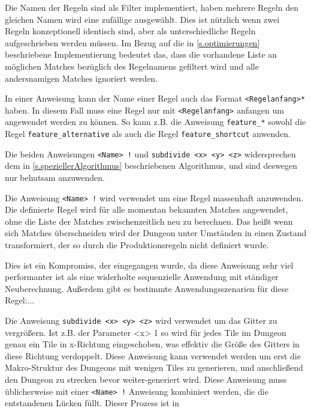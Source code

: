 Die Namen der Regeln sind als Filter implementiert, haben mehrere Regeln den gleichen Namen wird eine zufällige ausgewählt. Dies ist nützlich wenn zwei Regeln konzeptionell identisch sind, aber als unterschiedliche Regeln aufgeschrieben werden müssen. Im Bezug auf die in \ref{s.optimierungen} beschriebene Implementierung bedeutet das, dass die vorhandene Liste an möglichen Matches bezüglich des Regelnamens gefiltert wird und alle andersnamigen Matches ignoriert werden. 

In einer Anweisung kann der Name einer Regel auch das Format \texttt{<Regelanfang>*} haben. In diesem Fall muss eine Regel nur mit \texttt{<Regelanfang>} anfangen um angewendet werden zu können. So kann z.B. die Anweisung \texttt{feature\_*} sowohl die Regel \texttt{feature\_alternative} als auch die Regel \texttt{feature\_shortcut} anwenden.

Die beiden Anweisungen \texttt{<Name> !} und \texttt{subdivide <x> <y> <z>} widersprechen dem in \ref{s.speziellerAlgorithmus} beschriebenen Algorithmus, und sind deswegen nur behutsam anzuwenden.

Die Anweisung \texttt{<Name> !} wird verwendet um eine Regel massenhaft anzuwenden. Die definierte Regel wird für alle momentan bekannten Matches angewendet, ohne die Liste der Matches zwischenzeitlich neu zu berechnen. Das heißt wenn sich Matches überschneiden wird der Dungeon unter Umständen in einen Zustand transformiert, der so durch die Produktionsregeln nicht definiert wurde. 

Dies ist ein Kompromiss, der eingegangen wurde, da diese Anweisung sehr viel performanter ist als eine widerholte sequenzielle Anwendung mit ständiger Neuberechnung. Außerdem gibt es bestimmte Anwendungsszenarien für diese Regel:...

Die Anweisung \texttt{subdivide <x> <y> <z>} wird verwendet um das Gitter zu vergrößern. Ist z.B. der Parameter <x> 1 so wird für jedes Tile im Dungeon genau ein Tile in x-Richtung eingeschoben, was effektiv die Größe des Gitters in diese Richtung verdoppelt. Diese Anweisung kann verwendet werden um erst die Makro-Struktur des Dungeons mit wenigen Tiles zu generieren, und anschließend den Dungeon zu strecken bevor weiter-generiert wird. Diese Anweisung muss üblicherweise mit einer \texttt{<Name> !} Anweisung kombiniert werden, die die entstandenen Lücken füllt. Dieser Prozess ist in 


